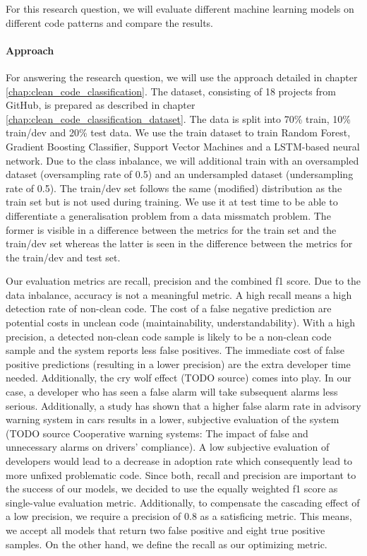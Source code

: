 For this research question, we will evaluate different machine learning models on different code patterns and compare the results.

\paragraph{Approach}
For answering the research question, we will use the approach detailed in chapter \ref{chap:clean_code_classification}.  The dataset, consisting of 18 projects from GitHub, is prepared as described in chapter \ref{chap:clean_code_classification_dataset}. The data is split into 70\% train, 10\% train/dev and 20\% test data. We use the train dataset to train Random Forest, Gradient Boosting Classifier, Support Vector Machines and a LSTM-based neural network. Due to the class inbalance, we will additional train with an oversampled dataset (oversampling rate of 0.5) and an undersampled dataset (undersampling rate of 0.5). The train/dev set follows the same (modified) distribution as the train set but is not used during training. We use it at test time to be able to differentiate a generalisation problem from a data missmatch problem. The former is visible in a difference between the metrics for the train set and the train/dev set whereas the latter is seen in the difference between the metrics for the train/dev and test set.

Our evaluation metrics are recall, precision and the combined f1 score. Due to the data inbalance, accuracy is not a meaningful metric. A high recall means a high detection rate of non-clean code. The cost of a false negative prediction are potential costs in unclean code (maintainability, understandability). With a high precision, a detected non-clean code sample is likely to be a non-clean code sample and the system reports less false positives. The immediate cost of false positive predictions (resulting in a lower precision) are the extra developer time needed. Additionally, the cry wolf effect (TODO source) comes into play. In our case, a developer who has seen a false alarm will take subsequent alarms less serious. Additionally, a study has shown that a higher false alarm rate in advisory warning system in cars results in a lower, subjective evaluation of the system (TODO source Cooperative warning systems: The impact of false and unnecessary alarms on drivers’ compliance). A low subjective evaluation of developers would lead to a decrease in adoption rate which consequently lead to more unfixed problematic code. Since both, recall and precision are important to the success of our models, we decided to use the equally weighted f1 score as single-value evaluation metric.
Additionally, to compensate the cascading effect of a low precision, we require a precision of 0.8 as a satisficing metric. This means, we accept all models that return two false positive and eight true positive samples. On the other hand, we define the recall as our optimizing metric.

